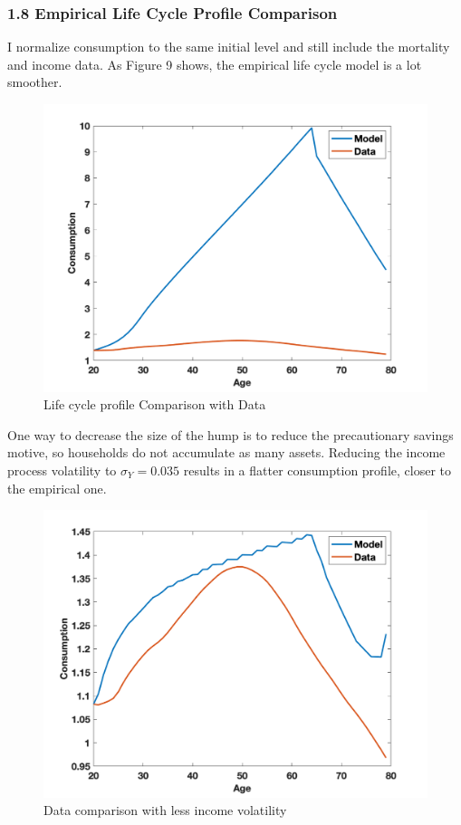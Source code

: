 \documentclass[letterpaper,12pt]{article}
\begin{document}
\subsubsection*{1.8 Empirical Life Cycle Profile Comparison}


I normalize consumption to the same initial level and still include the mortality and income data. As Figure 9 shows, the empirical life cycle model is a lot smoother. \\
\begin{figure}
\includegraphics[scale=0.45]{Figures/Part1_PE/Data_comparison}
\caption{Life cycle profile Comparison with Data}
\end{figure}

One way to decrease the size of the hump is to reduce the precautionary savings motive, so households do not accumulate as many assets. Reducing the income process volatility to $\sigma_Y = 0.035$ results in a flatter consumption profile, closer to the empirical one. \\

\begin{figure}
\includegraphics[scale=0.45]{Figures/Part1_PE/Data_comparison2}
\caption{Data comparison with less income volatility}
\end{figure}
\end{document}
